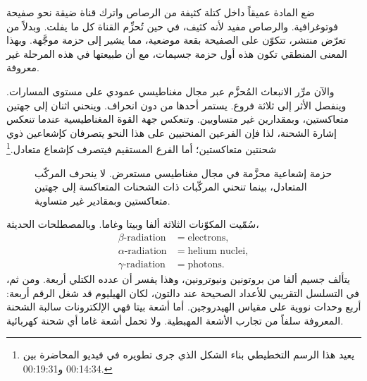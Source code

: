 ضع المادة عميقاً داخل كتلة كثيفة من الرصاص واترك قناة ضيقة نحو صفيحة فوتوغرافية. والرصاص مفيد لأنه كثيف، في حين تُحزِّم القناة كل ما يفلت. وبدلاً من تعرّض منتشر، تتكوّن على الصفيحة بقعة موضعية، مما يشير إلى حزمة موجَّهة. وبهذا المعنى المنطقي تكون هذه أول حزمة جسيمات، مع أن طبيعتها في هذه المرحلة غير معروفة.

والآن مرِّر الانبعاث المُحزَّم عبر مجال مغناطيسي عمودي على مستوى المسارات. وينفصل الأثر إلى ثلاثة فروع. يستمر أحدها من دون انحراف. وينحني اثنان إلى جهتين متعاكستين، وبمقدارين غير متساويين. وتنعكس جهة القوة المغناطيسية عندما تنعكس إشارة الشحنة، لذا فإن الفرعين المنحنيين على هذا النحو يتصرفان كإشعاعين ذوي شحنتين متعاكستين؛ أما الفرع المستقيم فيتصرف كإشعاع متعادل.\footnote{يعيد هذا الرسم التخطيطي بناء الشكل الذي جرى تطويره في فيديو المحاضرة بين 00:14:34 و00:19:31.}

\begin{figure}[h]
\centering
{}
\caption{حزمة إشعاعية محزَّمة في مجال مغناطيسي مستعرض. لا ينحرف المركّب المتعادل، بينما تنحني المركّبات ذات الشحنات المتعاكسة إلى جهتين متعاكستين وبمقادير غير متساوية.}
\end{figure}

سُمّيت المكوّنات الثلاثة ألفا وبيتا وغاما. وبالمصطلحات الحديثة،
\begin{equation}
\begin{aligned}
\beta\text{-radiation} &= \text{electrons},\\
\alpha\text{-radiation} &= \text{helium nuclei},\\
\gamma\text{-radiation} &= \text{photons}.
\end{aligned}
\end{equation}
يتألف جسيم ألفا من بروتونين ونيوترونين، وهذا يفسر أن عدده الكتلي أربعة. ومن ثم، في التسلسل التقريبي للأعداد الصحيحة عند دالتون، لكان الهيليوم قد شغل الرقم أربعة: أربع وحدات نووية على مقياس الهيدروجين. أما أشعة بيتا فهي الإلكترونات سالبة الشحنة المعروفة سلفاً من تجارب الأشعة المهبطية. ولا تحمل أشعة غاما أي شحنة كهربائية.

